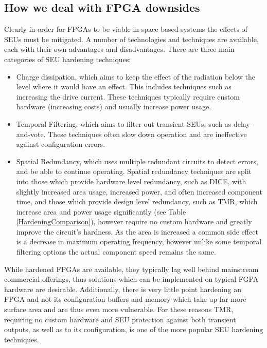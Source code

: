 \documentclass[12pt,drafta4paper,oneside]{memoir} %
\begin{document}
\subsection{How we deal with FPGA downsides}
Clearly in order for \acp{FPGA} to be viable in space based systems the effects of \acp{SEU} must be mitigated. A number of technologies and techniques are available, each with their own advantages and disadvantages.
There are three main categories of \ac{SEU} hardening techniques\cite{HardeningTechniques}:
\begin{itemize}
    \item Charge dissipation, which aims to keep the effect of the radiation below the level where it would have an effect. This includes techniques such as increasing the drive current. These techniques typically require custom hardware (increasing costs) and usually increase power usage.
    \item Temporal Filtering, which aims to filter out transient \acp{SEU}, such as delay-and-vote\cite{HardeningTechniques}. These techniques often slow down operation and are ineffective against configuration errors.
    \item Spatial Redundancy, which uses multiple redundant circuits to detect errors, and be able to continue operating. Spatial redundancy techniques are split into those which provide hardware level redundancy, such as \ac{DICE}, with slightly increased area usage, increased power, and often increased component time, and those which provide design level redundancy, such as \ac{TMR}, which increase area and power usage significantly (see Table \ref{HardeningComparison}), however require no custom hardware and greatly improve the circuit's hardness. As the area is increased a common side effect is a decrease in maximum operating frequency, however unlike some temporal filtering options the actual component speed remains the same.
\end{itemize}
While hardened \acp{FPGA} are available, they typically lag well behind mainstream commercial offerings\cite{VFPGATMR}, thus solutions which can be implemented on typical \ac{FGPA} hardware are desirable. Additionally, there is very little point hardening an \ac{FPGA} and not its configuration buffers and memory which take up far more surface area and are thus even more vulnerable.
For these reasons \ac{TMR}, requiring no custom hardware and \ac{SEU} protection against both transient outputs, as well as to its configuration, is one of the more popular \ac{SEU} hardening techniques.
\end{document}
